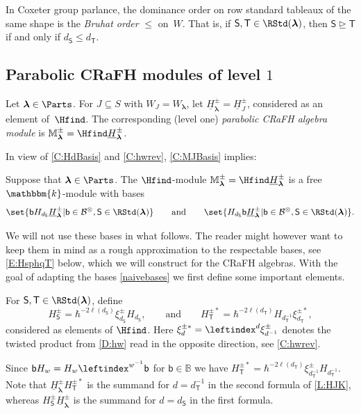 \documentclass[a4paper,11pt]{amsart}
\let\gedom=\trianglerighteq
\newcommand\blam{{\boldsymbol\lambda}}
\newcommand\cB{\mathcal{B}}
\newcommand\cBo{\cB^{\otimes}}
\numberwithin{equation}{subsection}
\theoremstyle{definition}
\theoremstyle{theorem}
\theoremstyle{remark}
\newcommand\HJ{\underline{H}}
\newcommand\MJ{\mathbb{M}}
\newcommand\HJpm{\underline{H}^\pm}
\newcommand\Sym{W}
\newcommand\bb{\mathsf{b}}
\newcommand\bS{{\mathsf{S}}}
\newcommand\bT{{\mathsf{T}}}
\newcommand\kk{\mathbbm{k}}
\newcommand{\Bo}{\mathbb{B}}
\begin{document}
  In Coxeter group parlance, the dominance order on row
 standard tableaux of the same shape is  the \emph{
 Bruhat order} $\leq$ on~$\Sym$. That is, if $\bS,\bT\in\RStd(\blam)$,
 then $\bS\gedom\bT$ if and only if $d_\bS\le d_\bT$.

\subsection{Parabolic CRaFH modules of level $1$}
 \begin{Definition}\label{leveloneparab}
Let $\blam\in\Parts$. For $J\subseteq S$ with $\Sym_J=\Sym_\blam$, let $\HJ^\pm_\blam=\HJ^\pm_J$, considered as an
element of~$\Hfind$. The corresponding (level one) \emph{parabolic CRaFH
algebra module} is  $\MJ^\pm_\blam=\Hfind\HJ^\pm_\blam$.
\end{Definition}

In view of \autoref{C:HdBasis} and \autoref{C:hwrev},
\autoref{C:MJBasis} implies:
\begin{Proposition}\label{C:StdMJBasis}
  Suppose that $\blam\in\Parts$. The $\Hfind$-module
  $\MJ^\pm_\blam=\Hfind\HJ^\pm_\blam$ is a
  free $\kk$-module with bases
 \begin{equation} \label{naivebases}
      \set{\bb H_{d_\bS}\HJ^\pm_\blam|\bb\in\cBo, \bS\in \RStd(\blam)}
      \qquad\text{and}\qquad
      \set{H_{d_\bS}\bb\HJ^\pm_\blam|\bb\in\cBo, \bS\in \RStd(\blam)}.
  \end{equation}
\end{Proposition}
We will not use these bases in what follows. The reader might however want to keep them in mind as  a rough approximation to the respectable bases, see \autoref{E:HsphqT} below, which we will construct for the
CRaFH algebras. With the goal of adapting the bases \autoref{naivebases} we first define some important elements.

\begin{Definition}
For $\bS,\bT\in \RStd(\blam)$, define
\begin{equation}\label{E:HS}
  H^\pm_\bS = \hbar^{-2\ell(d_\bS)}\xi^\pm_{d_\bS} H_{d_\bS},
  \qquad\text{and}\qquad
  H^{\pm*}_\bT = \hbar^{-2\ell(d_\bT)}H_{d_\bT^{-1}}\xi^{\pm*}_{d_\bT},
\end{equation}
considered as elements of $\Hfind$. Here $\xi^{\pm*}_d=\leftindex^d{{\xi^\pm_{d^{-1}}}}$ denotes the twisted product from
\autoref{D:hw} read in the opposite direction, see \autoref{C:hwrev}.
\end{Definition}
\begin{Remark}
 Since
$\bb H_w=H_w\leftindex^{w^{-1}}{\bb}$ for $\bb\in\Bo$ we have
$H^{\pm*}_\bT=\hbar^{-2\ell(d_\bT)}\xi^\pm_{d_\bT^{-1}}H_{d_\bT^{-1}}$. Note that  $\HJpm_\blam H^{\pm*}_\bT$
is the summand for $d=d_\bT^{-1}$ in the second formula of \autoref{L:HJK}, whereas
$H^\pm_\bS\HJpm_\blam$ is the summand for $d=d_\bS$ in the first formula.
\end{Remark}
\end{document}
